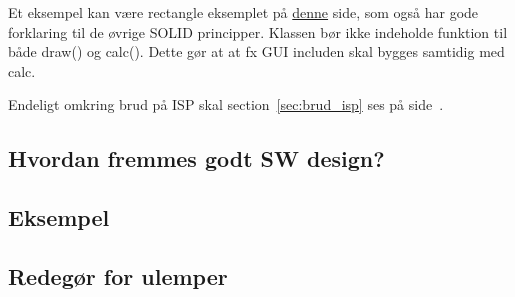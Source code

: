 Et eksempel kan være rectangle eksemplet på  \href{http://code.tutsplus.com/tutorials/solid-part-3-liskov-substitution-interface-segregation-principles--net-36710}{denne} side, som også har gode forklaring til de øvrige SOLID principper. Klassen bør ikke indeholde funktion til både draw() og calc(). Dette gør at at fx GUI includen skal bygges samtidig med calc.

Endeligt omkring brud på ISP skal section~\ref{sec:brud_isp} ses på side~\pageref{sec:brud_isp}.




\subsection{Hvordan fremmes godt SW design?}

\subsection{Eksempel}

\subsection{Redegør for ulemper}